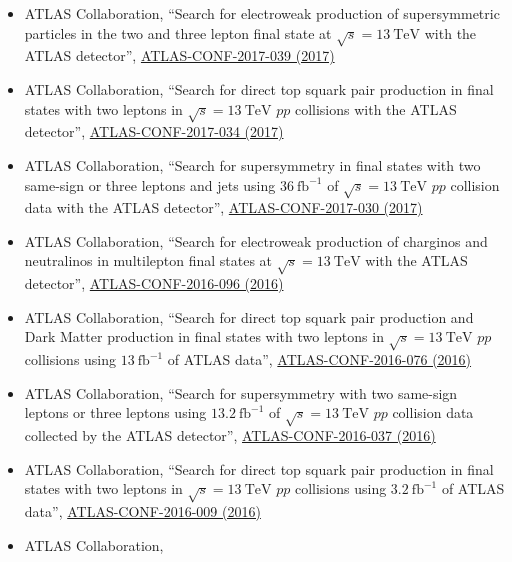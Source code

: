 \documentclass[a4paper,10pt]{article}
\begin{document}
\begin{itemize}
	\item ATLAS Collaboration,
	``Search for electroweak production of supersymmetric particles in the two and three lepton final state at $\sqrt{s}=13\ \mathrm{TeV}$ with the ATLAS detector'',
	\href{https://atlas.web.cern.ch/Atlas/GROUPS/PHYSICS/CONFNOTES/ATLAS-CONF-2017-039/}{ATLAS-CONF-2017-039 (2017)}
	\item ATLAS Collaboration,
	``Search for direct top squark pair production in final states with two leptons in $\sqrt{s}=13\ \mathrm{TeV}$ $pp$ collisions with the ATLAS detector'',
	\href{https://atlas.web.cern.ch/Atlas/GROUPS/PHYSICS/CONFNOTES/ATLAS-CONF-2017-034/}{ATLAS-CONF-2017-034 (2017)}
	\item ATLAS Collaboration,
	``Search for supersymmetry in final states with two same-sign or three leptons and jets using $36\ \mathrm{fb}^{-1}$ of $\sqrt{s}=13\ \mathrm{TeV}$ $pp$ collision data with the ATLAS detector'',
	\href{https://atlas.web.cern.ch/Atlas/GROUPS/PHYSICS/CONFNOTES/ATLAS-CONF-2017-030/}{ATLAS-CONF-2017-030 (2017)}
	\item ATLAS Collaboration,
	``Search for electroweak production of charginos and neutralinos in multilepton final states at $\sqrt{s}=13\ \mathrm{TeV}$ with the ATLAS detector'',
	\href{https://atlas.web.cern.ch/Atlas/GROUPS/PHYSICS/CONFNOTES/ATLAS-CONF-2016-096/}{ATLAS-CONF-2016-096 (2016)}
	\item ATLAS Collaboration, 
	``Search for direct top squark pair production and Dark Matter production in final states with two leptons in $\sqrt{s}=13\ \mathrm{TeV}$ $pp$ collisions using $13\ \mathrm{fb}^{-1}$ of ATLAS data'',
	\href{https://atlas.web.cern.ch/Atlas/GROUPS/PHYSICS/CONFNOTES/ATLAS-CONF-2016-076/}{ATLAS-CONF-2016-076 (2016)}
	\item ATLAS Collaboration,
	``Search for supersymmetry with two same-sign leptons or three leptons using $13.2\ \mathrm{fb}^{-1}$ of $\sqrt{s}=13\ \mathrm{TeV}$ $pp$ collision data collected by the ATLAS detector'',
	\href{https://atlas.web.cern.ch/Atlas/GROUPS/PHYSICS/CONFNOTES/ATLAS-CONF-2016-037/}{ATLAS-CONF-2016-037 (2016)} 
	\item ATLAS Collaboration, 
	``Search for direct top squark pair production in final states with two leptons in $\sqrt{s}=13\ \mathrm{TeV}$ $pp$ collisions using $3.2\ \mathrm{fb}^{-1}$ of ATLAS data'',
	\href{https://atlas.web.cern.ch/Atlas/GROUPS/PHYSICS/CONFNOTES/ATLAS-CONF-2016-009/}{ATLAS-CONF-2016-009 (2016)} 	
	\item ATLAS Collaboration, 

\end{itemize}
\end{document}
